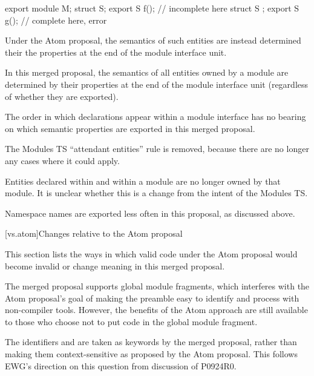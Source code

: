 \begin{codeblock}
export module M;
struct S;
export S f();  //  incomplete here
struct S {};
export S g();  //  complete here, error
\end{codeblock}

Under the Atom proposal,
the semantics of such entities
are instead determined their the properties
at the end of the module interface unit.

In this merged proposal,
the semantics of all entities owned by a module
are determined by their properties
at the end of the module interface unit
(regardless of whether they are exported).
\begin{note}
The order in which declarations appear within a module interface
has no bearing on which semantic properties are exported
in this merged proposal.
\end{note}

The Modules TS ``attendant entities'' rule is removed,
because there are no longer any cases where it could apply.

\pnum
Entities declared within  and 
within a module are no longer owned by that module.
It is unclear whether this is a change from the intent of
the Modules TS.

\pnum
Namespace names are exported less often in this proposal, as discussed above.

[vs.atom]{Changes relative to the Atom proposal}

\pnum
This section lists the ways in which valid code under the Atom proposal
would become invalid or change meaning in this merged proposal.

\pnum
The merged proposal supports global module fragments,
which interferes with the Atom proposal's goal
of making the preamble easy to identify and process
with non-compiler tools.
However, the benefits of the Atom approach are still available
to those who choose not to put code in the global module fragment.

\pnum
The identifiers  and  are taken as keywords
by the merged proposal,
rather than making them context-sensitive as proposed by the Atom proposal.
This follows EWG's direction on this question from discussion of P0924R0.
